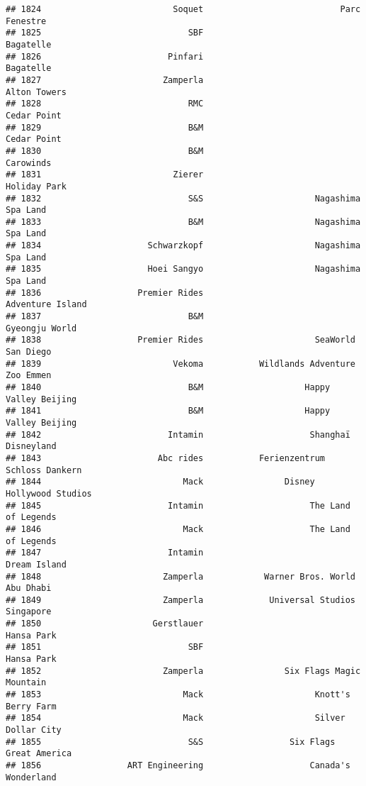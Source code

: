 \documentclass[
]{article}
\begin{document}
\begin{verbatim}
## 1824                          Soquet                           Parc Fenestre
## 1825                             SBF                               Bagatelle
## 1826                         Pinfari                               Bagatelle
## 1827                        Zamperla                            Alton Towers
## 1828                             RMC                             Cedar Point
## 1829                             B&M                             Cedar Point
## 1830                             B&M                               Carowinds
## 1831                          Zierer                            Holiday Park
## 1832                             S&S                      Nagashima Spa Land
## 1833                             B&M                      Nagashima Spa Land
## 1834                     Schwarzkopf                      Nagashima Spa Land
## 1835                     Hoei Sangyo                      Nagashima Spa Land
## 1836                   Premier Rides                        Adventure Island
## 1837                             B&M                          Gyeongju World
## 1838                   Premier Rides                      SeaWorld San Diego
## 1839                          Vekoma           Wildlands Adventure Zoo Emmen
## 1840                             B&M                    Happy Valley Beijing
## 1841                             B&M                    Happy Valley Beijing
## 1842                         Intamin                     Shanghaï Disneyland
## 1843                       Abc rides           Ferienzentrum Schloss Dankern
## 1844                            Mack                Disney Hollywood Studios
## 1845                         Intamin                     The Land of Legends
## 1846                            Mack                     The Land of Legends
## 1847                         Intamin                            Dream Island
## 1848                        Zamperla            Warner Bros. World Abu Dhabi
## 1849                        Zamperla             Universal Studios Singapore
## 1850                      Gerstlauer                              Hansa Park
## 1851                             SBF                              Hansa Park
## 1852                        Zamperla                Six Flags Magic Mountain
## 1853                            Mack                      Knott's Berry Farm
## 1854                            Mack                      Silver Dollar City
## 1855                             S&S                 Six Flags Great America
## 1856                 ART Engineering                     Canada's Wonderland

\end{verbatim}
\end{document}
